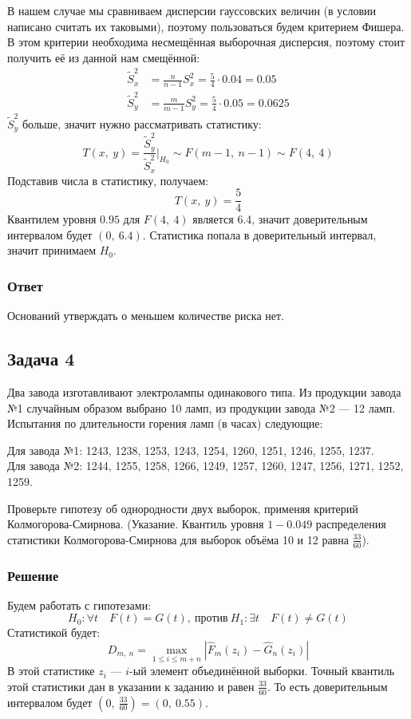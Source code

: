 \documentclass[12pt, a4paper]{article}
\begin{document}
В нашем случае мы сравниваем дисперсии гауссовских величин (в условии написано считать их таковыми), поэтому пользоваться будем критерием Фишера. В этом критерии необходима несмещённая выборочная дисперсия, поэтому стоит получить её из данной нам смещённой:
\begin{equation*}
    \begin{aligned}
        \tilde S^2_x &= \frac{n}{n - 1} S_x^2 = \frac{5}{4}\cdot 0.04 = 0.05\\
        \tilde S^2_y &= \frac{m}{m - 1} S_y^2 = \frac{5}{4}\cdot 0.05 = 0.0625
    \end{aligned}
\end{equation*}
$\tilde S^2_y$ больше, значит нужно рассматривать статистику:
\[T(x,\ y) = \frac{\tilde S^2_y}{\tilde S^2_x}\bigg|_{H_0} \sim F(m - 1,\ n - 1) \sim F(4,\ 4)\]
Подставив числа в статистику, получаем:
\[T(x,\ y) = \frac{5}{4}\]
Квантилем уровня $0.95$ для $F(4,\ 4)$ является 6.4, значит доверительным интервалом будет $(0,\ 6.4)$. Статистика попала в доверительный интервал, значит принимаем $H_0$.
\subsubsection*{Ответ}
Оснований утверждать о меньшем количестве риска нет.
\subsection*{Задача 4}
Два завода изготавливают электролампы одинакового типа. Из продукции завода №1 случайным образом выбрано 10 ламп, из продукции завода №2 --- 12 ламп.  Испытания по длительности горения ламп (в часах) следующие:
\begin{center}
    \begin{minipage}{0.8\textwidth}
        Для завода №1: 1243, 1238, 1253, 1243, 1254, 1260, 1251, 1246, 1255, 1237.\\
        Для завода №2: 1244, 1255, 1258, 1266, 1249, 1257, 1260, 1247, 1256, 1271, 1252, 1259.
   \end{minipage}
\end{center}
Проверьте гипотезу об однородности двух выборок, применяя критерий Колмогорова-Смирнова. (Указание. Квантиль уровня $1-0.049$ распределения статистики Колмогорова-Смирнова для выборок объёма 10 и 12 равна $\frac{33}{60}$).
\subsubsection*{Решение}
Будем работать с гипотезами:
\[H_0: \forall t\quad F(t) = G(t),\ \text{против}\ H_1: \exists t\quad F(t) \neq G(t)\]
Статистикой будет:
\[D_{m,\ n} = \max\limits_{1 \leq i \leq m + n} \left| \hat F_{m}(z_i) - \hat G_{n}(z_i) \right|\]
В этой статистике $z_i$ --- $i$-ый элемент объединённой выборки. Точный квантиль этой статистики дан в указании к заданию и равен $\frac{33}{60}$. То есть доверительным интервалом будет $\left(0,\ \frac{33}{60}\right) = \left(0,\ 0.55\right)$.
\end{document}

